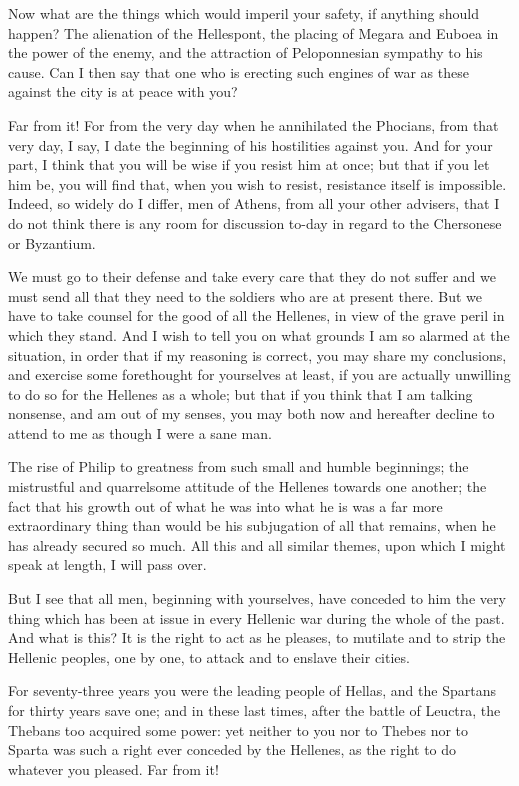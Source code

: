 \documentclass[a4paper]{amsbook}
\begin{document}
Now what are the things which would imperil your safety, if anything should happen? The alienation of the Hellespont, the placing of Megara and Euboea in the power of the enemy, and the attraction of Peloponnesian sympathy to his cause. Can I then say that one who is erecting such engines of war as these against the city is at peace with you?

Far from it! For from the very day when he annihilated the Phocians, from that very day, I say, I date the beginning of his hostilities against you. And for your part, I think that you will be wise if you resist him at once; but that if you let him be, you will find that, when you wish to resist, resistance itself is impossible. Indeed, so widely do I differ, men of Athens, from all your other advisers, that I do not think there is any room for discussion to-day in regard to the Chersonese or Byzantium.

We must go to their defense and take every care that they do not suffer and we must send all that they need to the soldiers who are at present there. But we have to take counsel for the good of all the Hellenes, in view of the grave peril in which they stand. And I wish to tell you on what grounds I am so alarmed at the situation, in order that if my reasoning is correct, you may share my conclusions, and exercise some forethought for yourselves at least, if you are actually unwilling to do so for the Hellenes as a whole; but that if you think that I am talking nonsense, and am out of my senses, you may both now and hereafter decline to attend to me as though I were a sane man.

The rise of Philip to greatness from such small and humble beginnings; the mistrustful and quarrelsome attitude of the Hellenes towards one another; the fact that his growth out of what he was into what he is was a far more extraordinary thing than would be his subjugation of all that remains, when he has already secured so much. All this and all similar themes, upon which I might speak at length, I will pass over.

But I see that all men, beginning with yourselves, have conceded to him the very thing which has been at issue in every Hellenic war during the whole of the past. And what is this? It is the right to act as he pleases, to mutilate and to strip the Hellenic peoples, one by one, to attack and to enslave their cities.

For seventy-three years you were the leading people of Hellas, and the Spartans for thirty years save one; and in these last times, after the battle of Leuctra, the Thebans too acquired some power: yet neither to you nor to Thebes nor to Sparta was such a right ever conceded by the Hellenes, as the right to do whatever you pleased. Far from it!
\end{document}
